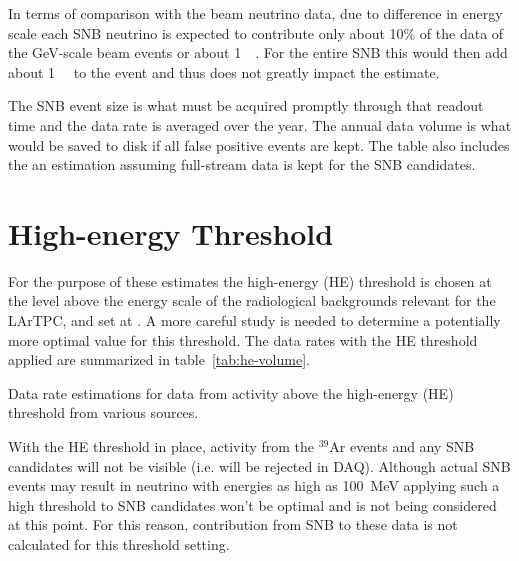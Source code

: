 In terms of comparison with the beam neutrino data, 
due to difference in energy scale each SNB neutrino is expected to contribute only
about 10\% of the data of the
\si{\GeV}-scale beam events or about \SI{1}{\mega\byte}.
For the entire SNB this would then add about \SI{1}{\giga\byte} to the
event and thus does not greatly impact the estimate.

The SNB event size is what must be acquired promptly through that
readout time and the data rate is averaged over the year.
The annual data volume is what would be saved to disk if all false
positive events are kept.
The table also includes the an estimation assuming full-stream data is
kept for the SNB candidates.

\section{High-energy Threshold}

For the purpose of these estimates the  high-energy (HE) threshold is chosen at the level above 
the energy scale of the radiological backgrounds relevant for the LArTPC, and set at  \chargehethreshold.
A more careful study is needed to determine a potentially more optimal value for this threshold.
The data rates with the HE threshold applied are summarized in table~\ref{tab:he-volume}.

\begin{table}[htbp]
  \centering
  \caption{Data rate estimations for data from activity above the
    high-energy (HE) threshold from various sources.}
  
  \label{tab:he-volume}
\end{table}

With the HE threshold in place, activity from the $^{39}$Ar events and any SNB
candidates will not be visible (i.e. will be rejected in DAQ).
Although actual SNB events may result in neutrino with energies as high as
\SI{100}{\MeV} applying such a high threshold to SNB candidates won't be optimal and is not being considered at this point.
For this reason, contribution from SNB to these data is not calculated for this threshold setting.




